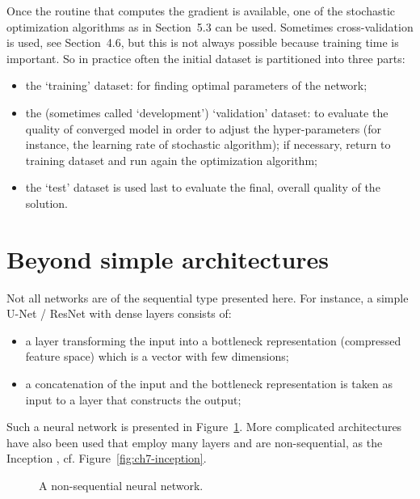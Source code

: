 Once the routine that computes the gradient is available, one of the stochastic optimization algorithms as in Section~5.3 can be used. Sometimes cross-validation is used, see Section~4.6, but this is not always possible because training time is important. So in practice often the initial dataset is partitioned into three parts:
\begin{itemize}
  \item the `training' dataset: for finding optimal parameters of the network;
  \item the (sometimes called `development') `validation' dataset: to evaluate the quality of converged model in order to adjust the hyper-parameters (for instance, the learning rate of stochastic algorithm); if necessary, return to training dataset and run again the optimization algorithm;
  \item the `test' dataset is used last to evaluate the final, overall quality of the solution.
\end{itemize}

\section{Beyond simple architectures}

Not all networks are of the sequential type presented here. For instance, a simple U-Net / ResNet with dense layers consists of:
\begin{itemize}
  \item a layer transforming the input into a bottleneck representation (compressed feature space) which is a vector with few dimensions;
  \item a concatenation of the input and the bottleneck representation is taken as input to a layer that constructs the output;
\end{itemize}
Such a neural network is presented in Figure~\ref{fig:ch7-nonseq}. More complicated architectures have also been used that employ many layers and are non-sequential, as the Inception \cite{turinici14}, cf. Figure~\ref{fig:ch7-inception}.

\begin{figure}[h]\centering
\caption{A non-sequential neural network.}\label{fig:ch7-nonseq}
\end{figure}

